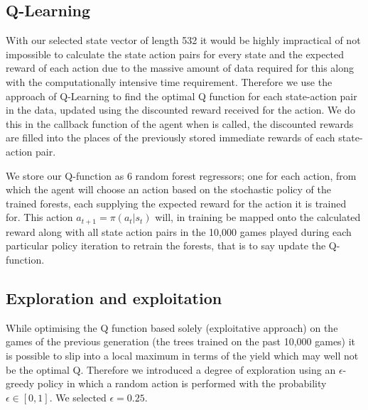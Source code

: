 	\subsection{Q-Learning}
	With our selected state vector of length 532 it would be highly impractical of not impossible to calculate the state action pairs for every state and the expected reward of each action due to the massive amount of data required for this along with the computationally intensive time requirement. Therefore we use the approach of Q-Learning to find the optimal Q function for each state-action pair in the data, updated using the discounted reward received for the action. We do this in the callback function of the agent when  is called, the discounted rewards are filled into the places of the previously stored immediate rewards of each state-action pair. 
	
	We store our Q-function as 6 random forest regressors; one for each action, from which the agent will choose an action based on the stochastic policy of the trained forests, each supplying the expected reward for the action it is trained for. This action $a_{t+1} = \pi(a_t|s_t)$ will, in training be mapped onto the calculated reward along with all state action pairs in the 10,000 games played during each particular policy iteration to retrain the forests, that is to say update the Q-function.
	
	\subsection{Exploration and exploitation}

	While optimising the Q function based solely (exploitative approach) on the games of the previous generation (the trees trained on the past 10,000 games) it is possible to slip into a local maximum in terms of the yield which may well not be the optimal Q. Therefore we introduced a degree of exploration using an $\epsilon$-greedy policy in which a random action is performed with the probability $\epsilon \in [0,1]$. We selected $\epsilon = 0.25$. \par
	
